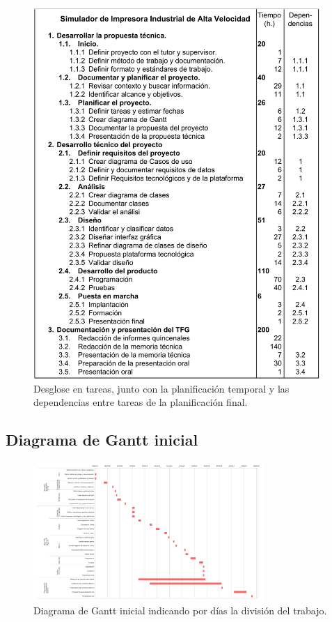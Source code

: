 \documentclass[pdftex,11pt,a4paper]{book}
\begin{document}
\begin{figure}[H]
\includegraphics[width=0.97\textwidth]{img/lista_tareas_final.png}
\caption{\label{tareas_final}Desglose en tareas, junto con la planificación temporal y las dependencias entre tareas de la planificación final.}
\end{figure}

\subsection{Diagrama de Gantt inicial}

\begin{figure}[H]
\begin{center}
\includegraphics[angle=90,width=0.78\textwidth]{img/diagrama_gantt.png}
\caption{\label{gantt_inicial}Diagrama de Gantt inicial indicando por días la división del trabajo.}
\end{center}
\end{figure}
\end{document}
